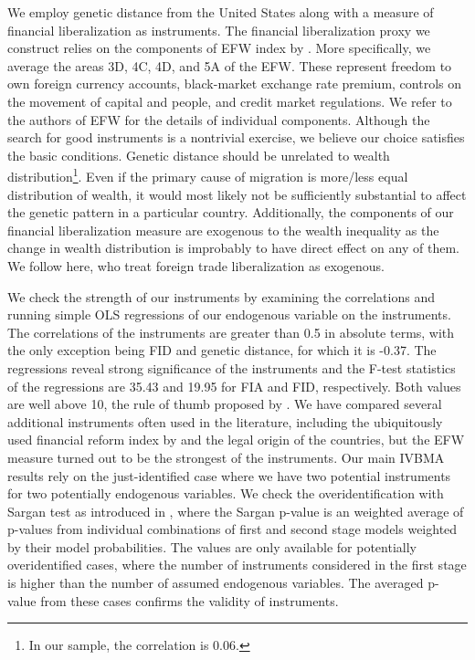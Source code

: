 \begin{refsection}
We employ genetic distance from the United States \parencite{spolaore2009diffusion} along with a measure of financial liberalization as instruments. The financial liberalization proxy we construct relies on the components of \ac{EFW} index by \parencite{gwartney2017}. More specifically, we average the areas 3D, 4C, 4D, and 5A of the \ac{EFW}. These represent freedom to own foreign currency accounts, black-market exchange rate premium, controls on the movement of capital and people, and credit market regulations. We refer to the authors of \ac{EFW} for the details of individual components. Although the search for good instruments is a nontrivial exercise, we believe our choice satisfies the basic conditions. Genetic distance should be unrelated to wealth distribution\footnote{In our sample, the correlation is 0.06.}. Even if the primary cause of migration is more/less equal distribution of wealth, it would most likely not be sufficiently substantial to affect the genetic pattern in a particular country. Additionally, the components of our financial liberalization measure are exogenous to the wealth inequality as the change in wealth distribution is improbably to have direct effect on any of them. We follow \textcite{estev} here, who treat foreign trade liberalization as exogenous.

We check the strength of our instruments by examining the correlations and running simple \ac{OLS} regressions of our endogenous variable on the instruments. The correlations of the instruments are greater than 0.5 in absolute terms, with the only exception being FID and genetic distance, for which it is -0.37. The regressions reveal strong significance of the instruments and the F-test statistics of the regressions are 35.43 and 19.95 for FIA and FID, respectively. Both values are well above 10, the rule of thumb proposed by \textcite{staiger1997instrumental}. We have compared several additional instruments often used in the literature, including the ubiquitously used financial reform index by \textcite{Abiadetal2008} and the legal origin of the countries, but the \ac{EFW} measure turned out to be the strongest of the instruments. Our main \ac{IVBMA} results rely on the just-identified case where we have two potential instruments for two potentially endogenous variables. We check the overidentification with Sargan test as introduced in \textcite{lenkoski2014two}, where the Sargan p-value is an weighted average of p-values from individual combinations of first and second stage models weighted by their model probabilities. The values are only available for potentially overidentified cases, where the number of instruments considered in the first stage is higher than the number of assumed endogenous variables. The averaged p-value from these cases confirms the validity of instruments.


\end{refsection}

